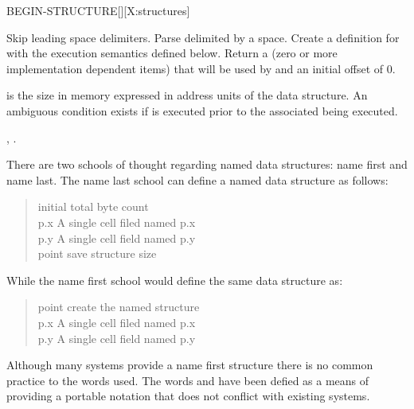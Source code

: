 \begin{worddef}{}{BEGIN-STRUCTURE}[][X:structures]
\item {}

	Skip leading space delimiters. Parse  delimited
	by a space. Create a definition for  with the
	execution semantics defined below.  Return a 
	(zero or more implementation dependent items) that will be
	used by  and an initial offset of 0.

\execute[name]

	 is the size in memory expressed in address units of
	the data structure.  An ambiguous condition exists if
	 is executed prior to the associated
	 being executed.

\see {},
	.


	\begin{rationale} %
		There are two schools of thought regarding named data
		structures: name first and name last.  The name last
		school can define a named data structure as follows:

		\begin{quote} \tab[11.5]  initial total byte count \\
		   p.x	\tab {} A single cell filed named p.x \\
		   p.y   \tab {} A single cell field named p.y \\
		 point \tab[3.8]  save structure size
		\end{quote}

		While the name first school would define the same data
		structure as:

		\begin{quote}\ttfamily
		 point \tab[-.3]  create the named structure \\
		   p.x	\tab {} A single cell filed named p.x \\
		   p.y   \tab {} A single cell field named p.y \\
		\end{quote}

		Although many systems provide a name first structure there
		is no common practice to the words used.  The words
		 and  have been
		defied as a means of providing a portable notation that does
		not conflict with existing systems.


\end{rationale}
\end{worddef}
